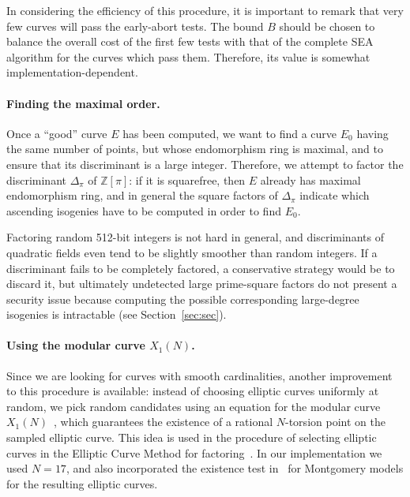 \documentclass{llncs}
\newcommand{\Z}{\mathbb{Z}}
\begin{document}
In considering the efficiency of this procedure, it is important to remark
that very few curves will pass the early-abort tests. 
The bound $B$ should be chosen 
to balance the overall cost of the first few tests with that of
the complete SEA algorithm for the curves which pass them. Therefore,
its value is somewhat implementation-dependent. 

\paragraph{Finding the maximal order.}
Once a ``good'' curve $E$ has been computed, we want to find a curve
$E_0$ having the same number of points, but whose endomorphism ring is maximal, and
to ensure that its discriminant is a large integer. Therefore, we attempt to
factor the discriminant $Δ_\pi$ of $\Z[\pi]$: if it is squarefree,
then $E$ already has maximal endomorphism ring, and in general the square
factors of $Δ_\pi$ indicate which ascending isogenies have to be computed
in order to find $E_0$.

\begin{remark}
    Factoring random 512-bit integers is not hard in general, 
    and discriminants of quadratic fields
    even tend to be slightly smoother than random integers.
    If a discriminant fails to be completely factored,
		a conservative strategy would be to discard it,
    but ultimately undetected large prime-square factors
    do not present a security issue
    because computing the possible corresponding large-degree isogenies 
    is intractable (see Section~\ref{sec:sec}).
\end{remark}

\paragraph{Using the modular curve $X_1(N)$.}
Since we are looking for curves with smooth cardinalities, another
improvement to this procedure is available: instead of choosing elliptic
curves uniformly at random, we pick random candidates using
an equation for the modular curve $X_1(N)$~\cite{sutherland2012constructing},
which guarantees the existence of a rational $N$-torsion point
on the sampled elliptic curve.
This idea is used
in the procedure of selecting elliptic curves in the Elliptic Curve Method
for factoring~\cite{ECM20,GMP-ECM}.
In our implementation we used $N = 17$,
and also incorporated the existence test in~\cite{OKS00}
for Montgomery models for the resulting elliptic curves.
\end{document}
